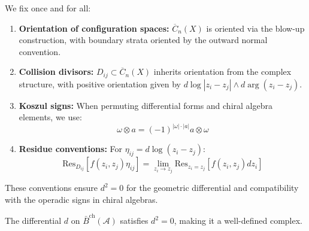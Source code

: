 \begin{convention}\label{conv:orientations}
We fix once and for all:
\begin{enumerate}
\item \textbf{Orientation of configuration spaces:} $\overline{C}_n(X)$ is oriented via the blow-up construction, with boundary strata oriented by the outward normal convention.

\item \textbf{Collision divisors:} $D_{ij} \subset \overline{C}_n(X)$ inherits orientation from the complex structure, with positive orientation given by $d\log|z_i - z_j| \wedge d\arg(z_i - z_j)$.

\item \textbf{Koszul signs:} When permuting differential forms and chiral algebra elements, we use:
\[
\omega \otimes a = (-1)^{|\omega| \cdot |a|} a \otimes \omega
\]

\item \textbf{Residue conventions:} For $\eta_{ij} = d\log(z_i - z_j)$:
\[
\text{Res}_{D_{ij}}[f(z_i, z_j) \eta_{ij}] = \lim_{z_i \to z_j} \text{Res}_{z_i = z_j}[f(z_i, z_j) dz_i]
\]
\end{enumerate}
These conventions ensure $d^2 = 0$ for the geometric differential and compatibility with the operadic signs in chiral algebras.
\end{convention}

\begin{theorem}\label{thm:d-squared}
The differential $d$ on $\bar{B}^{\text{ch}}(\mathcal{A})$ satisfies $d^2 = 0$, making it a well-defined complex.
\end{theorem}

